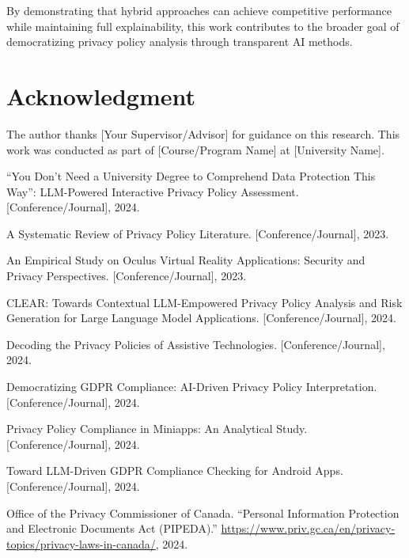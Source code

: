 \documentclass[conference]{IEEEtran}
\begin{document}
By demonstrating that hybrid approaches can achieve competitive performance while maintaining full explainability, this work contributes to the broader goal of democratizing privacy policy analysis through transparent AI methods.

\section*{Acknowledgment}

The author thanks [Your Supervisor/Advisor] for guidance on this research. This work was conducted as part of [Course/Program Name] at [University Name].

\begin{thebibliography}{00}

``You Don't Need a University Degree to Comprehend Data Protection This Way'': LLM-Powered Interactive Privacy Policy Assessment. [Conference/Journal], 2024.

A Systematic Review of Privacy Policy Literature. [Conference/Journal], 2023.

An Empirical Study on Oculus Virtual Reality Applications: Security and Privacy Perspectives. [Conference/Journal], 2023.

CLEAR: Towards Contextual LLM-Empowered Privacy Policy Analysis and Risk Generation for Large Language Model Applications. [Conference/Journal], 2024.

Decoding the Privacy Policies of Assistive Technologies. [Conference/Journal], 2024.

Democratizing GDPR Compliance: AI-Driven Privacy Policy Interpretation. [Conference/Journal], 2024.

Privacy Policy Compliance in Miniapps: An Analytical Study. [Conference/Journal], 2024.

Toward LLM-Driven GDPR Compliance Checking for Android Apps. [Conference/Journal], 2024.

Office of the Privacy Commissioner of Canada. ``Personal Information Protection and Electronic Documents Act (PIPEDA).'' \url{https://www.priv.gc.ca/en/privacy-topics/privacy-laws-in-canada/}, 2024.

\end{thebibliography}
\end{document}
